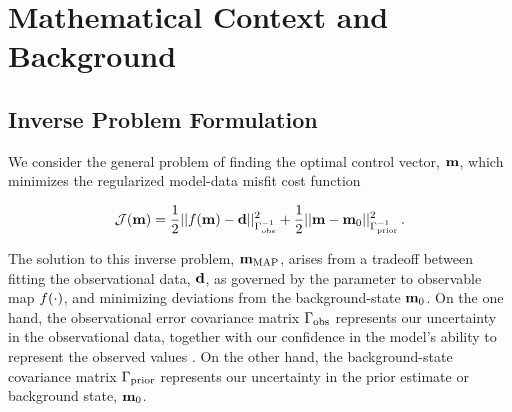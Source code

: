 \section{Mathematical Context and Background}
\label{sec:review}


\subsection{Inverse Problem Formulation}
\label{ssec:da_formulation}

We consider the general problem of finding the optimal control vector,
$\mathbf{m}$, which minimizes the regularized model-data misfit cost function
\begin{linenomath*}\begin{equation*}
    \mathcal{J}(\mathbf{m}) =
        \dfrac{1}{2}||f(\mathbf{m}) - \mathbf{d}||_{\Gamma_\text{obs}^{-1}}^2
        +
        \dfrac{1}{2}||\mathbf{m} - \mathbf{m}_{0}||_{\Gamma_{\text{prior}}^{-1}}^2 \, .
\end{equation*}\end{linenomath*}
The solution to this inverse problem, $\mathbf{m}_{\text{MAP}}$, arises from a tradeoff between fitting the
observational data, $\mathbf{d}$, as governed by the parameter to observable map
$f(\cdot)$, and minimizing deviations from the background-state $\mathbf{m}_{0}$.
On the one hand, the observational error covariance matrix
$\Gamma_\text{obs}$ represents our uncertainty
in the observational data, together with our confidence in the model's ability
to represent the observed values .
On the other hand, the background-state covariance matrix $\Gamma_{\text{prior}}$
represents our uncertainty in the prior estimate or background state,
$\mathbf{m}_{0}$.


